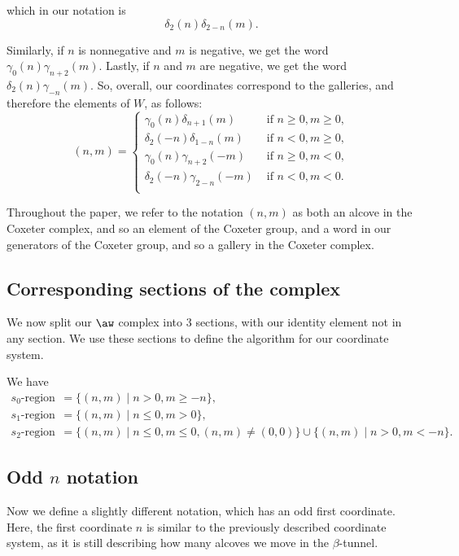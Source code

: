 \documentclass[11pt]{article}
\begin{document}
which in our notation is
\[\delta_2(n)\delta_{2-n}(m).\]


Similarly, if $n$ is nonnegative and $m$ is negative, we get the word
$\gamma_0(n)\gamma_{n+2}(m)$. Lastly, if $n$ and $m$ are negative, we get the word
$\delta_2(n)\gamma_{-n}(m)$. So, overall, our coordinates correspond to the galleries, and therefore the elements of $W$, as follows:
\[(n,m)=\begin{cases}
    \gamma_0(n)\delta_{n+1}(m) & \text{ if } n\geq 0,m\geq 0,\\
    \delta_2(-n)\delta_{1-n}(m) & \text{ if } n<0,m\geq 0,\\
    \gamma_0(n)\gamma_{n+2}(-m)& \text{ if } n\geq 0,m<0, \\
    \delta_2(-n)\gamma_{2-n}(-m)& \text{ if } n<0,m< 0.\\
\end{cases}\]

Throughout the paper, we refer to the notation $(n,m)$ as both an alcove in the Coxeter complex, and so an element of the Coxeter group, and a word in our generators of the Coxeter group, and so a gallery in the Coxeter complex. 

\subsection{Corresponding sections of the complex}

 We now split our $\aw$ complex into 3 sections, with our identity element not in any section. We use these sections to define the algorithm for our coordinate system.

\begin{center}
\resizebox{0.5\textwidth}{!}{}
\end{center}

We have
\begin{align*}
    s_0 \text{-region}&=\{(n,m)\mid n>0, m\geq -n\},\\
    s_1 \text{-region}&=\{(n,m)\mid n\leq 0, m> 0\},\\
    s_2 \text{-region}&=\{(n,m)\mid n\leq 0, m\leq 0, (n,m)\neq (0,0)\}\cup\{(n,m)\mid n> 0, m<-n\}.
\end{align*}


\subsection{Odd $n$ notation}\label{involution}

Now we define a slightly different notation, which has an odd first coordinate. Here, the first coordinate $n$ is similar to the previously described coordinate system, as it is still describing how many alcoves we move in the $\beta$-tunnel.
\end{document}
